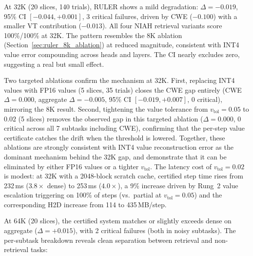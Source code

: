 \documentclass[10pt,twocolumn,a4paper]{article}
\theoremstyle{definition}
\theoremstyle{remark}
\begin{document}
{
At 32K (20 slices, 140 trials), RULER shows a mild degradation: $\Delta{=}{-}0.019$, 95\% CI $[-0.044, {+}0.001]$, 3 critical failures, driven by CWE ($-0.100$) with a smaller VT contribution ($-0.013$).  All four NIAH retrieval variants score 100\%/100\% at 32K\@.  The pattern resembles the 8K ablation (Section~\ref{sec:ruler_8k_ablation}) at reduced magnitude, consistent with INT4 value error compounding across heads and layers.  The CI nearly excludes zero, suggesting a real but small effect.
\par}

Two targeted ablations confirm the mechanism at 32K\@.  First, replacing INT4 values with FP16 values (5 slices, 35 trials) closes the CWE gap entirely (CWE $\Delta{=}0.000$, aggregate $\Delta{=}{-}0.005$, 95\% CI $[-0.019, {+}0.007]$, 0 critical), mirroring the 8K result.  Second, tightening the value tolerance from $v_{\mathrm{tol}}{=}0.05$ to $0.02$ (5 slices) removes the observed gap in this targeted ablation ($\Delta{=}0.000$, 0 critical across all 7 subtasks including CWE), confirming that the per-step value certificate catches the drift when the threshold is lowered.  Together, these ablations are strongly consistent with INT4 value reconstruction error as the dominant mechanism behind the 32K gap, and demonstrate that it can be eliminated by either FP16 values or a tighter $v_{\mathrm{tol}}$.  The latency cost of $v_{\mathrm{tol}}{=}0.02$ is modest: at 32K with a 2048-block scratch cache, certified step time rises from 232\,ms ($3.8\times$ dense) to 253\,ms ($4.0\times$), a 9\% increase driven by Rung~2 value escalation triggering on 100\% of steps (vs.\ partial at $v_{\mathrm{tol}}{=}0.05$) and the corresponding H2D increase from 114 to 435\,MB/step.

At 64K (20 slices), the certified system matches or slightly exceeds dense on aggregate ($\Delta{=}{+}0.015$), with 2 critical failures (both in noisy subtasks).  The per-subtask breakdown reveals clean separation between retrieval and non-retrieval tasks:
\end{document}
